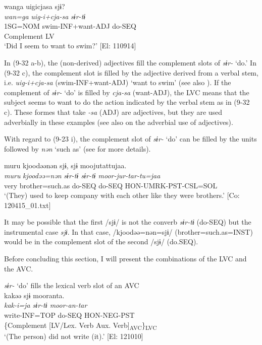 \ex \label{ex:9.32c} %
    \gllll  wanga  uigicjasa  sjɨ?\\
      \textit{wan=ga}  \textit{uig-i+cja-sa}  \textit{sɨr{}-tɨ}\\
      1SG=NOM  swim-INF+want-ADJ  do-SEQ\\
        Complement  LV\\
      \glt       ‘Did I seem to want to swim?’ [El: 110914]
    \z
\z

In (9-32 a-b), the (non-derived) adjectives fill the complement slots of \textit{sɨr-} ‘do.’ In (9-32 c), the complement slot is filled by the adjective derived from a verbal stem, i.e. \textit{uig-i+cja-sa} (swim-INF+want-ADJ) ‘want to swim’ (see also ). If the complement of \textit{sɨr-} ‘do’ is filled by \textit{cja-sa} (want-ADJ), the LVC means that the subject seems to want to do the action indicated by the verbal stem as in (9-32 c). These formes that take \textit{{}-sa} (ADJ) are adjectives, but they are used adverbially in these examples (see also  on the adverbial use of adjectives).

With regard to (9-23 i), the complement slot of \textit{sɨr-} ‘do’ can be filled by the units followed by \textit{nən} ‘such as’ (see  for more details).

\ea   \label{ex:9.33}
\glll  muru  kjoodəənən  sjɨ,  sjɨ  moojutattujaa.\\
    \textit{muru}  \textit{kjoodəə=nən}  \textit{sɨr{}-tɨ  sɨr-tɨ  moor-jur-tar-tu=jaa}\\
    very  brother=such.as  do-SEQ  do-SEQ  HON-UMRK-PST-CSL=SOL\\
    \glt     ‘(They) used to keep company with each other like they were brothers.’ [Co: 120415\_01.txt]
\z

It may be possible that the first /sjɨ/ is not the converb \textit{sɨr-tɨ} (do-SEQ) but the instrumental case \textit{sjɨ}. In that case, /kjoodəə=nən=sjɨ/ (brother=such.as=INST) would be in the complement slot of the second /sjɨ/ (do.SEQ).

Before concluding this section, I will present the combinations of the LVC and the AVC.

\ea   \label{ex:9.34}
\ea \textit{sɨr-} ‘do’ fills the lexical verb slot of an AVC \label{ex:9.34a}\\
 \gllll  kakəə  sjɨ  mooranta.\\
    \textit{kak{}-i=ja  sɨr{}-tɨ  moor{}-an-tar}\\
    write-INF=TOP  do-SEQ  HON-NEG-PST\\
    \{Complement  [LV/Lex. Verb  Aux. Verb]\textsubscript{AVC}\}\textsubscript{LVC}\\
    \glt     ‘(The person) did not write (it).’ [El: 121010]

